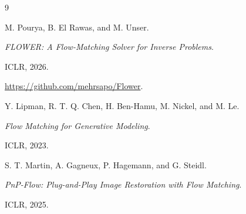 \documentclass[11pt,a4paper]{article}
\begin{document}
\FloatBarrier



\begin{thebibliography}{9}


M. Pourya, B. El Rawas, and M. Unser.

\emph{FLOWER: A Flow-Matching Solver for Inverse Problems}.

ICLR, 2026.

\url{https://github.com/mehrsapo/Flower}.



Y. Lipman, R. T. Q. Chen, H. Ben-Hamu, M. Nickel, and M. Le.

\emph{Flow Matching for Generative Modeling}.

ICLR, 2023.



S. T. Martin, A. Gagneux, P. Hagemann, and G. Steidl.

\emph{PnP-Flow: Plug-and-Play Image Restoration with Flow Matching}.

ICLR, 2025.


\end{thebibliography}
\end{document}
